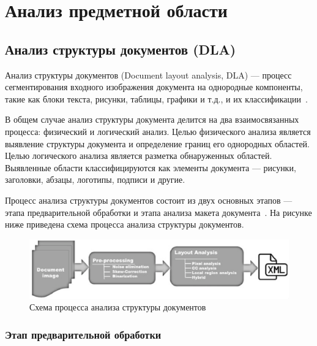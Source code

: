 \section{Анализ предметной области}

 

\subsection{Анализ структуры документов (DLA)}

Анализ структуры документов (Document layout analysis, DLA) --- процесс сегментирования входного изображения документа на однородные компоненты, такие как блоки текста, рисунки, таблицы, графики и т.д., и их классификации~\cite{tnt}.

В общем случае анализ структуры документа делится на два взаимосвязанных процесса: физический и логический анализ.
Целью физического анализа является выявление структуры документа и определение границ его однородных областей.
Целью логического анализа является разметка обнаруженных областей. Выявленные области классифицируются как элементы документа --- рисунки, заголовки, абзацы, логотипы, подписи и другие.~\cite{dla-survey}

Процесс анализа структуры документов состоит из двух основных этапов --- этапа предварительной обработки и этапа анализа макета документа~\cite{dla-survey, dla-book}.
На рисунке ниже приведена схема процесса анализа структуры документов.

\begin{figure}[H]
	\centering
	\includegraphics[width=\textwidth]{img/typical-dla-system.png}
	\caption{Схема процесса анализа структуры документов~\cite{dla-book}}
	\label{fig:}
\end{figure}

\subsubsection{Этап предварительной обработки}

